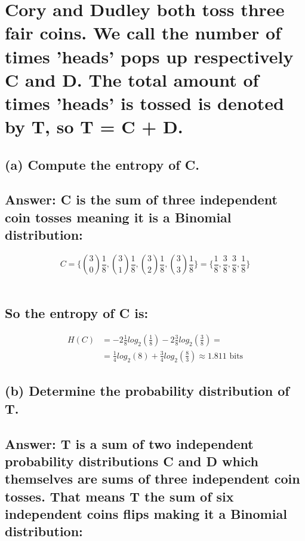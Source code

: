 \documentclass[11px]{article}
\begin{document}
\section{\normalfont Cory and Dudley both toss three fair coins. We call the number of times 'heads' pops up respectively C and D. The total amount of times 'heads' is tossed is denoted by T, so T = C + D.}

\subsection*{\normalfont (a) Compute the entropy of C.}

\subsection*{Answer: C is the sum of three independent coin tosses meaning it is a Binomial distribution:}

\begin{equation}
C = \{\binom{3}{0}\frac{1}{8}, \binom{3}{1}\frac{1}{8}, \binom{3}{2}\frac{1}{8}, \binom{3}{3}\frac{1}{8}\} = \{\frac{1}{8}, \frac{3}{8}, \frac{3}{8}, \frac{1}{8}\}
\end{equation} \\
\subsection*{So the entropy of C is:}
\begin{equation}
\begin{split}
H(C) & = -2\frac{1}{8}log_2(\frac{1}{8}) - 2\frac{3}{8}log_2(\frac{3}{8}) = \\
& = \frac{1}{4}log_2(8) + \frac{3}{4}log_2(\frac{8}{3}) \approx 1.811 \text{ bits}
\end{split}
\end{equation}

\subsection*{\normalfont (b) Determine the probability distribution of T.}

\subsection*{Answer: T is a sum of two independent probability distributions C and D which themselves are sums of three independent coin tosses. That means T the sum of six independent coins flips making it a Binomial distribution:}
\end{document}
